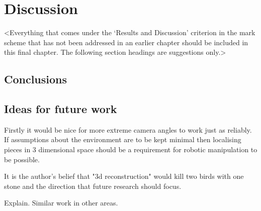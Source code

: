 \chapter{Discussion}
\label{chapter4}

<Everything that comes under the `Results and Discussion' criterion in the mark scheme that has not been addressed in an earlier chapter should be included in this final chapter. The following section headings are suggestions only.>

\section{Conclusions}

\section{Ideas for future work}
Firstly it would be nice for more extreme camera angles to work just as reliably.  If assumptions about the environment are to be kept minimal
then localising pieces in 3 dimensional space should be a requirement for robotic manipulation to be possible.

It is the author's belief that "3d reconstruction" would kill two birds with one stone and the direction that future research should focus.

Explain.  Similar work in other areas.